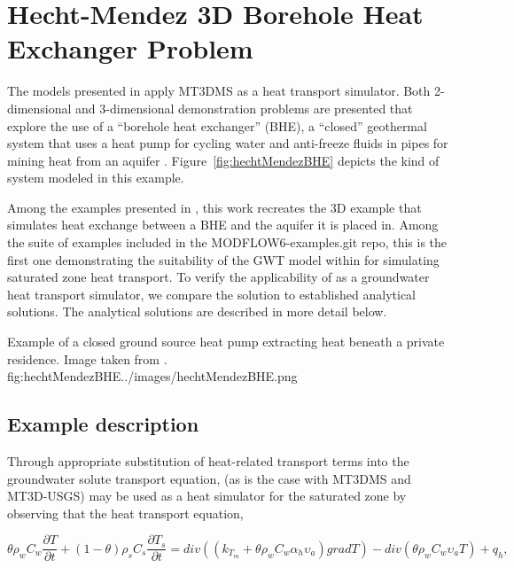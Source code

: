 \section{Hecht-Mendez 3D Borehole Heat Exchanger Problem}

The models presented in \cite{hechtMendez2010} apply MT3DMS \citep{zheng1999mt3dms} as a heat transport simulator.  Both 2-dimensional and 3-dimensional demonstration problems are presented that explore the use of a ``borehole heat exchanger'' (BHE), a ``closed'' geothermal system that uses a heat pump for cycling water and anti-freeze fluids in pipes for mining heat from an aquifer \citep{diao2004}.  Figure~\ref{fig:hechtMendezBHE} depicts the kind of system modeled in this example.

Among the examples presented in \cite{hechtMendez2010}, this work recreates the 3D example that simulates heat exchange between a BHE and the aquifer it is placed in.  Among the suite of examples included in the MODFLOW6-examples.git repo, this is the first one demonstrating the suitability of the GWT model within \mf for simulating saturated zone heat transport.  To verify the applicability of  as a groundwater heat transport simulator, we compare the \mf solution to established analytical solutions.  The analytical solutions are described in more detail below.

\begin{StandardFigure}{
                                     Example of a closed ground source heat pump extracting heat beneath a private residence.  Image taken from \cite{hecht2008}.
                                     }{fig:hechtMendezBHE}{../images/hechtMendezBHE.png}
\end{StandardFigure}

\subsection{Example description}

Through appropriate substitution of heat-related transport terms into the groundwater solute transport equation, \mf (as is the case with MT3DMS and MT3D-USGS) may be used as a heat simulator for the saturated zone by observing that the heat transport equation,

\begin{equation}
	\theta \rho_w C_w \frac{\partial T}{\partial t} + \left( 1 - \theta \right) \rho_s C_s \frac{\partial  T_s}{\partial t} = div \left( \left( k_{T_m} + \theta \rho_w C_w \alpha_h \upsilon_a \right) grad T\right) - div \left( \theta \rho_w C_w \upsilon_a T \right) + q_h,
	\label{eq:hm1}
\end{equation}
